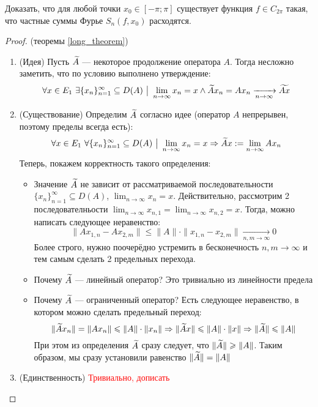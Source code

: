 \begin{exercise}
	Доказать, что для любой точки $x_0 \in [-\pi; \pi]$ существует функция $f \in C_{2\pi}$ такая, что частные суммы Фурье $S_n(f, x_0)$ расходятся.
\end{exercise}

\begin{proof} (теоремы \ref{long_theorem})
	\begin{enumerate}
		\item (Идея) Пусть $\widetilde{A}$ --- некоторое продолжение оператора $A$. Тогда несложно заметить, что по условию выполнено утверждение:
		\[
			\forall x \in E_1\ \exists \{x_n\}_{n = 1}^\infty \subseteq D(A) \ \big|\  \lim_{n \to \infty} x_n = x \wedge \widetilde{A}x_n = Ax_n \xrightarrow[n \to \infty]{} \widetilde{Ax}
		\]
		
		\item (Существование) Определим $\widetilde{A}$ согласно идее (оператор $A$ непрерывен, поэтому пределы всегда есть):
		\[
			\forall x \in E_1\ \forall \{x_n\}_{n = 1}^\infty \subseteq D(A) \ \big|\  \lim_{n \to \infty} x_n = x \Rightarrow \widetilde{A}x := \lim_{n \to \infty} Ax_n
		\]
		Теперь, покажем корректность такого определения:
		\begin{itemize}
			\item Значение $\widetilde{A}$ не зависит от рассматриваемой последовательности $\{x_n\}_{n = 1}^\infty \subseteq D(A)$, $\lim_{n \to \infty} x_n = x$. Действительно, рассмотрим 2 последователньости $\lim_{n \to \infty} x_{n, 1} = \lim_{n \to \infty} x_{n, 2} = x$. Тогда, можно написать следующее неравенство:
			\[
				\|Ax_{1, n} - Ax_{2, m}\| \le \|A\| \cdot \|x_{1, n} - x_{2, m}\| \xrightarrow[n, m \to \infty]{} 0
			\]
			Более строго, нужно поочерёдно устремить в бесконечность $n, m \to \infty$ и тем самым сделать 2 предельных перехода.
			
			\item Почему $\widetilde{A}$ --- линейный оператор? Это тривиально из линейности предела
			
			\item Почему $\widetilde{A}$ --- ограниченный оператор? Есть следующее неравенство, в котором можно сделать предельный переход:
			\[
				\|\widetilde{A}x_n\| = \|Ax_n\| \leqslant \|A\| \cdot \|x_n\| \Rightarrow \|\widetilde{A}x\| \leqslant \|A\| \cdot \|x\| \Rightarrow \|\widetilde{A}\| \leqslant \|A\|
			\]
			При этом из определения $\widetilde{A}$ сразу следует, что $\|\widetilde{A}\| \geqslant \|A\|$. Таким образом, мы сразу установили равенство $\|\widetilde{A}\| = \|A\|$
		\end{itemize}
	
		\item (Единственность) \textcolor{red}{Тривиально, дописать}
	\end{enumerate}
\end{proof}


